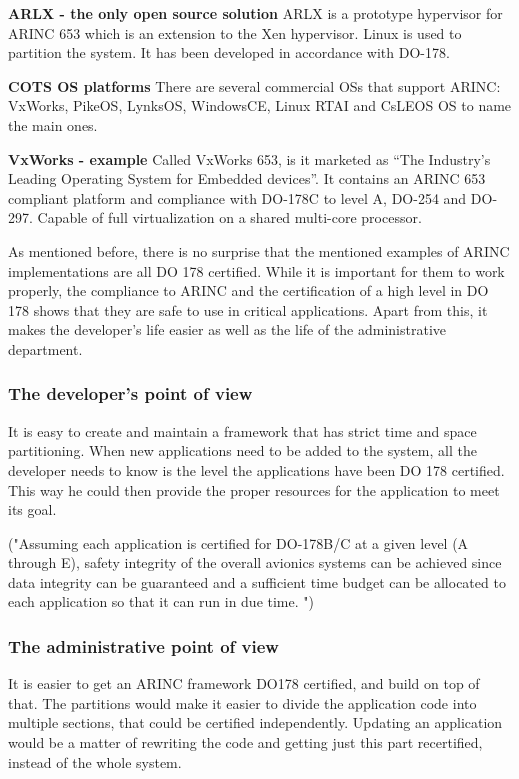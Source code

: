 \textbf{ARLX - the only open source solution}
ARLX is a prototype hypervisor for ARINC 653 which is an extension to the Xen hypervisor.
Linux is used to partition the system.
It has been developed in accordance with DO-178.

\textbf{COTS OS platforms}
There are several commercial OSs that support ARINC:
VxWorks, PikeOS, LynksOS, WindowsCE, Linux RTAI and CsLEOS OS to name the main ones.

\textbf{VxWorks - example}
Called VxWorks 653, is it marketed as ``The Industry's Leading Operating System for Embedded devices''.
It contains an ARINC 653 compliant platform and compliance with DO-178C to level A, DO-254 and DO-297.
Capable of full virtualization on a shared multi-core processor.

As mentioned before, there is no surprise that the mentioned examples 
of ARINC implementations are all DO 178 certified. While it is 
important for them to work properly, the compliance to ARINC and the
certification of a high level in DO 178 shows that they are safe to use
in critical applications. Apart from this, it makes the developer's
life easier as well as the life of the administrative department.

\subsubsection{The developer's point of view}
It is easy to create and maintain a framework that has strict time and space partitioning.
When new applications need to be added to the system, all the developer 
needs to know is the level the applications have been DO 178 certified.
This way he could then provide the proper resources for the application
to meet its goal.

("Assuming each application is certified for DO-178B/C at a given level (A through E), safety integrity of the overall avionics systems can be achieved since data integrity can be guaranteed and a sufficient time budget can be allocated to each application so that it can run in due time. ")

\subsubsection{The administrative point of view}
It is easier to get an ARINC framework DO178 certified, and build on top
of that. The partitions would make it easier to divide the application
code into multiple sections, that could be certified independently.
Updating an application would be a matter of rewriting the code and 
getting just this part recertified, instead of the whole system.

